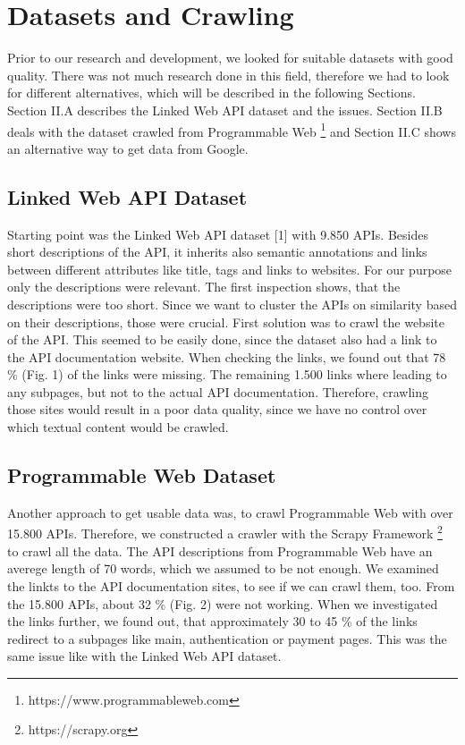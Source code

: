\documentclass[a4paper]{IEEEtran}
\begin{document}
\section{Datasets and Crawling}
Prior to our research and development, we looked for suitable datasets with good quality. There was not much research done in this field, therefore we had to look for different alternatives, which will be described in the following Sections. Section II.A describes the Linked Web API dataset and the issues. Section II.B deals with the dataset crawled from Programmable Web  \footnote[1]{https://www.programmableweb.com} and Section II.C shows an alternative way to get data from Google.

\subsection{Linked Web API Dataset}
Starting point was the Linked Web API dataset [1] with 9.850 APIs. Besides short descriptions of the API, it inherits also semantic annotations and links between different attributes like title, tags and links to websites. For our purpose only the descriptions were relevant. The first inspection shows, that the descriptions were too short. Since we want to cluster the APIs on similarity based on their descriptions, those were crucial. First solution was to crawl the website of the API. This seemed to be easily done, since the dataset also had a link to the API documentation website. When checking the links, we found out that 78 \% (Fig. 1) of the links were missing. The remaining 1.500 links where leading to any subpages, but not to the actual API documentation. Therefore, crawling those sites would result in a poor data quality, since we have no control over which textual content would be crawled.

\subsection{Programmable Web Dataset}
Another approach to get usable data was, to crawl Programmable Web with over 15.800 APIs. Therefore, we constructed a crawler with the Scrapy Framework \footnote[2]{https://scrapy.org} to crawl all the data. The API descriptions from Programmable Web have an averege length of 70 words, which we assumed to be not enough. We examined the linkts to the API documentation sites, to see if we can crawl them, too. From the 15.800 APIs, about 32 \% (Fig. 2) were not working. When we investigated the links further, we found out, that approximately 30 to 45 \% of the links redirect to a subpages like  main, authentication or payment pages. This was the same issue like with the Linked Web API dataset.
\end{document}
